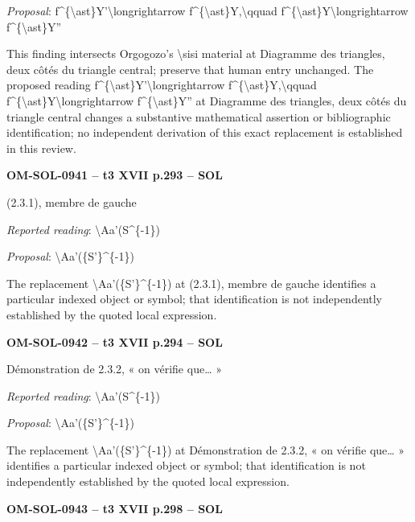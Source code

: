\emph{Proposal}: f\textasciicircum{}\{\textbackslash{}ast\}Y'\textbackslash{}longrightarrow f\textasciicircum{}\{\textbackslash{}ast\}Y,\textbackslash{}qquad f\textasciicircum{}\{\textbackslash{}ast\}Y\textbackslash{}longrightarrow f\textasciicircum{}\{\textbackslash{}ast\}Y''\par
This finding intersects Orgogozo's \textbackslash{}sisi material at Diagramme des triangles, deux côtés du triangle central; preserve that human entry unchanged. The proposed reading f\textasciicircum{}\{\textbackslash{}ast\}Y'\textbackslash{}longrightarrow f\textasciicircum{}\{\textbackslash{}ast\}Y,\textbackslash{}qquad f\textasciicircum{}\{\textbackslash{}ast\}Y\textbackslash{}longrightarrow f\textasciicircum{}\{\textbackslash{}ast\}Y'' at Diagramme des triangles, deux côtés du triangle central changes a substantive mathematical assertion or bibliographic identification; no independent derivation of this exact replacement is established in this review.\par
\par\noindent\textbf{OM-SOL-0941 -- t3 XVII p.293 -- SOL}\par
(2.3.1), membre de gauche\par
\emph{Reported reading}: \textbackslash{}Aa'(S\textasciicircum{}\{-1\})\par
\emph{Proposal}: \textbackslash{}Aa'(\{S'\}\textasciicircum{}\{-1\})\par
The replacement \textbackslash{}Aa'(\{S'\}\textasciicircum{}\{-1\}) at (2.3.1), membre de gauche identifies a particular indexed object or symbol; that identification is not independently established by the quoted local expression.\par
\par\noindent\textbf{OM-SOL-0942 -- t3 XVII p.294 -- SOL}\par
Démonstration de 2.3.2, « on vérifie que… »\par
\emph{Reported reading}: \textbackslash{}Aa'(S\textasciicircum{}\{-1\})\par
\emph{Proposal}: \textbackslash{}Aa'(\{S'\}\textasciicircum{}\{-1\})\par
The replacement \textbackslash{}Aa'(\{S'\}\textasciicircum{}\{-1\}) at Démonstration de 2.3.2, « on vérifie que… » identifies a particular indexed object or symbol; that identification is not independently established by the quoted local expression.\par
\par\noindent\textbf{OM-SOL-0943 -- t3 XVII p.298 -- SOL}\par
